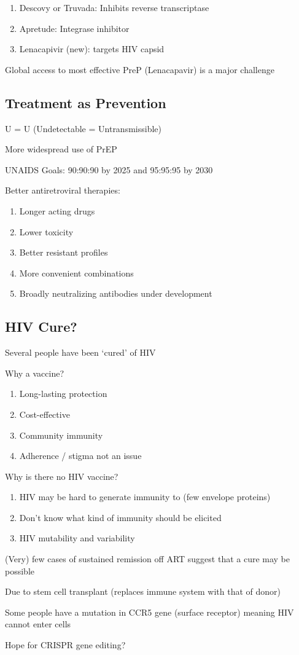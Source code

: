\documentclass{notes}
\begin{document}
\begin{enumerate}
    \item Descovy or Truvada: Inhibits reverse transcriptase
    \item Apretude: Integrase inhibitor
    \item Lenacapivir (new): targets HIV capsid
\end{enumerate}

Global access to most effective PreP (Lenacapavir) is a major challenge

\subsection{Treatment as Prevention}

U = U (Undetectable = Untransmissible)

More widespread use of PrEP

UNAIDS Goals: 90:90:90 by 2025 and 95:95:95 by 2030

Better antiretroviral therapies:

\begin{enumerate}
    \item Longer acting drugs
    \item Lower toxicity
    \item Better resistant profiles
    \item More convenient combinations
    \item Broadly neutralizing antibodies under development
\end{enumerate}

\subsection{HIV Cure?}

Several people have been `cured' of HIV

Why a vaccine?

\begin{enumerate}
    \item Long-lasting protection
    \item Cost-effective
    \item Community immunity
    \item Adherence / stigma not an issue
\end{enumerate}

Why is there no HIV vaccine?

\begin{enumerate}
    \item HIV may be hard to generate immunity to (few envelope proteins)
    \item Don't know what kind of immunity should be elicited
    \item HIV mutability and variability
\end{enumerate}

(Very) few cases of sustained remission off ART suggest that a cure may be possible

\tab Due to stem cell transplant (replaces immune system with that of donor)

Some people have a mutation in CCR5 gene (surface receptor) meaning HIV cannot enter cells

\tab Hope for CRISPR gene editing?
\end{document}
